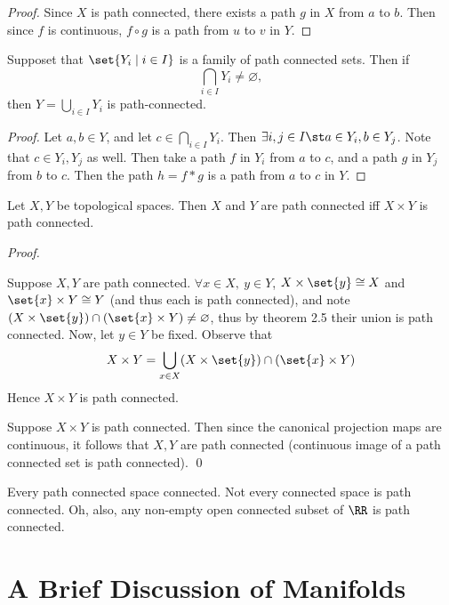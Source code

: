 \documentclass{fkbook}
\begin{document}
\begin{adjustwidth}{1em}{1em}
\begin{proof}
    Since $X$ is path connected, there exists a path $g$ in $X$ from
    $a$ to $b$. Then since $f$ is continuous, $f \circ g$ is a path
    from $u$ to $v$ in $Y$.
  \end{proof}
  \begin{theorem}
    Supposet that $\set{Y_i \mid i \in I}$ is a family of path
    connected sets. Then if
    \[
      \bigcap_{i \in I} Y_i \neq \varnothing,
    \]
    then $Y = \bigcup_{i \in I} Y_i$ is path-connected.
  \end{theorem}
  \begin{proof}
    Let $a,b \in Y$, and let $c \in \bigcap_{i \in I} Y_i$. Then
    $\exists i,j \in I \st a \in Y_i, b \in Y_j$. Note that $c \in
    Y_i, Y_j$ as well. Then take a path $f$ in $Y_i$ from $a$ to $c$,
    and a path $g$ in $Y_j$ from $b$ to $c$. Then the path $h = f * g$
    is a path from $a$ to $c$ in $Y$.
  \end{proof}
  \begin{theorem}
    Let $X,Y$ be topological spaces. Then $X$ and $Y$ are path
    connected iff $X \times Y$ is path connected.
  \end{theorem}
  \emph{Proof.}
  \begin{iffproof}
    \item Suppose $X,Y$ are path connected. $\forall x \in X,\ y \in
      Y$, $X \times \set{y} \cong X$ and $\set{x} \times Y \cong Y$
      (and thus each is path connected), and note $(X \times \set{y})
      \cap (\set{x} \times Y) \neq \varnothing$, thus by theorem 2.5
      their union is path connected. Now, let $y \in Y$ be fixed.
      Observe that
      \[
        X \times Y = \bigcup_{x \in X} (X \times \set{y}) \cap
        (\set{x} \times Y)
      \]
      Hence $X \times Y$ is path connected.
    \item Suppose $X \times Y$ is path connected. Then since the
      canonical projection maps are continuous, it follows that $X,Y$
      are path connected (continuous image of a path connected set is
      path connected). \qed
  \end{iffproof}
  \begin{theorem}
    Every path connected space connected. Not every connected space is
    path connected. Oh, also, any non-empty open connected subset of
    $\RR$ is path connected.
  \end{theorem}

  \section{A Brief Discussion of Manifolds}


\end{adjustwidth}
\end{document}

